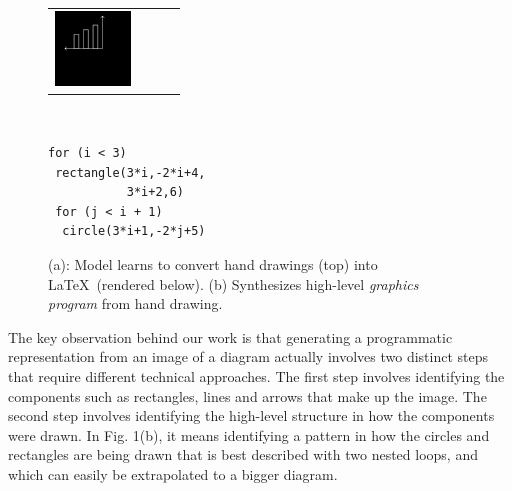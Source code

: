 \documentclass{article}
\newcommand{\exampleImageSize}{2cm}
\begin{document}
\begin{figure}[H]
\begin{minipage}[t]{0.7\linewidth}
\begin{tabular}{llll}
    \includegraphics[width = \exampleImageSize]{figures/58.png}
\end{tabular}
\subcaption{}
  \end{minipage}%
  \begin{minipage}[t]{0.3\linewidth}
    \\
    \begin{minipage}[t]{0.3\linewidth}
\begin{Verbatim}
for (i < 3)
 rectangle(3*i,-2*i+4,
           3*i+2,6)
 for (j < i + 1)
  circle(3*i+1,-2*j+5)
\end{Verbatim}      
      \end{minipage}
    \subcaption{}
  \end{minipage}
  \caption{(a): Model learns to convert hand drawings (top) into \LaTeX~(rendered below). (b) Synthesizes high-level \emph{graphics program} from hand drawing.}\label{firstPageExamples}
\end{figure}
 
The key observation behind our work is that generating a programmatic representation from an image of a diagram actually involves two distinct steps that require different technical approaches. The first step involves identifying the components such as rectangles, lines and arrows that make up the image. The second step involves identifying the high-level structure in how the components were drawn. In Fig. 1(b), it means identifying a pattern in how the circles and rectangles are being drawn that is best described with two nested loops, and which can easily be extrapolated to a bigger diagram. 
\end{document}
